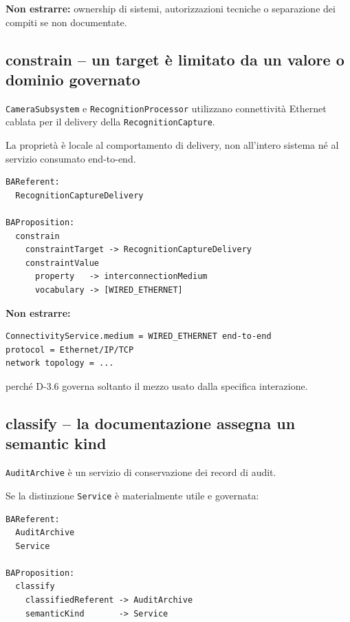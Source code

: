 \documentclass[11pt,a4paper]{article}
\newcommand{\code}[1]{\nolinkurl{#1}}
\begin{document}
\textbf{Non estrarre:} ownership di sistemi, autorizzazioni tecniche o separazione dei compiti se non documentate.

\subsection{constrain -- un target è limitato da un valore o dominio governato}

\begin{examplebox}
\code{CameraSubsystem} e \code{RecognitionProcessor} utilizzano connettività Ethernet cablata per il delivery della \code{RecognitionCapture}.
\end{examplebox}

La proprietà è locale al comportamento di delivery, non all'intero sistema né al servizio consumato end-to-end.

\begin{lstlisting}
BAReferent:
  RecognitionCaptureDelivery

BAProposition:
  constrain
    constraintTarget -> RecognitionCaptureDelivery
    constraintValue
      property   -> interconnectionMedium
      vocabulary -> [WIRED_ETHERNET]
\end{lstlisting}

\textbf{Non estrarre:}

\begin{lstlisting}
ConnectivityService.medium = WIRED_ETHERNET end-to-end
protocol = Ethernet/IP/TCP
network topology = ...
\end{lstlisting}

perché D-3.6 governa soltanto il mezzo usato dalla specifica interazione.

\subsection{classify -- la documentazione assegna un semantic kind}

\begin{examplebox}
\code{AuditArchive} è un servizio di conservazione dei record di audit.
\end{examplebox}

Se la distinzione \code{Service} è materialmente utile e governata:

\begin{lstlisting}
BAReferent:
  AuditArchive
  Service

BAProposition:
  classify
    classifiedReferent -> AuditArchive
    semanticKind       -> Service
\end{lstlisting}
\end{document}
